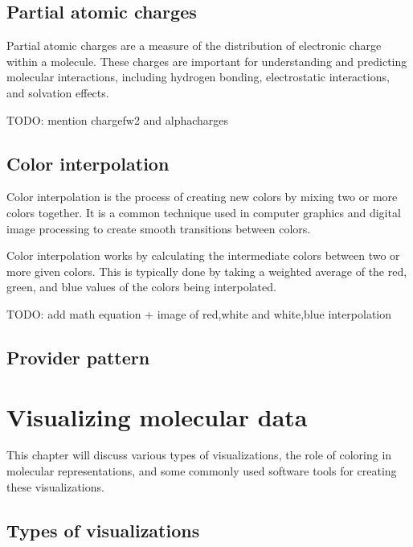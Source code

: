 \documentclass[
  digital,     %
  oneside,     %
  nosansbold,  %
  nocolorbold, %
  lof,         %
  lot,         %
]{fithesis4}
\begin{document}
\section{Partial atomic charges}
\label{section:partial_atomic_charges}

Partial atomic charges are a measure of the distribution of electronic charge within a molecule. These charges are important for understanding and predicting molecular interactions, including hydrogen bonding, electrostatic interactions, and solvation effects.

TODO: mention chargefw2 and alphacharges \\


\section{Color interpolation}
\label{section:color_interpolation}

Color interpolation is the process of creating new colors by mixing two or more colors together. It is a common technique used in computer graphics and digital image processing to create smooth transitions between colors.

Color interpolation works by calculating the intermediate colors between two or more given colors. This is typically done by taking a weighted average of the red, green, and blue values of the colors being interpolated.

TODO: add math equation + image of red,white and white,blue interpolation

\section{Provider pattern}
\label{section:provider_pattern}

\chapter{Visualizing molecular data}
\label{chapter:visualizing_molecular_data}

This chapter will discuss various types of visualizations, the role of coloring in molecular representations, and some commonly used software tools for creating these visualizations.

\section{Types of visualizations}
\label{section:types_of_visualizations}
\end{document}
